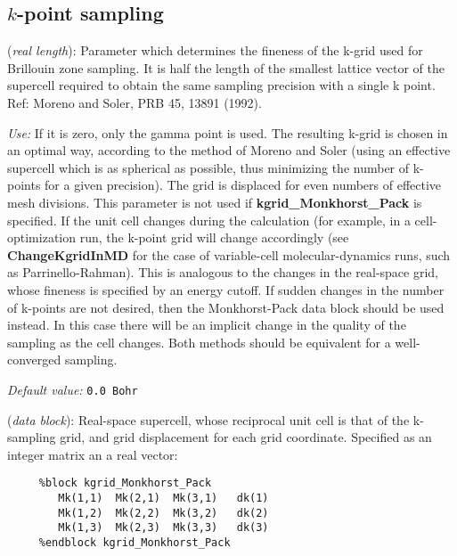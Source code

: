 \documentclass[11pt]{article}
\begin{document}
\subsection{$k$-point sampling}
\begin{description}
\itemsep 10pt
\parsep 0pt


\item[{\bf kgrid\_cutoff}] ({\it real length}): 
Parameter which determines
the fineness of the k-grid used for Brillouin zone sampling.
It is half the length of the smallest lattice vector of the supercell 
required to obtain the same sampling precision with a single k point.
Ref: Moreno and Soler, PRB 45, 13891 (1992).

{\it Use:} If it is zero, only the gamma point is used.  The resulting
k-grid is chosen in an optimal way, according to the method of Moreno
and Soler (using an effective supercell which is as spherical as
possible, thus minimizing the number of k-points for a given
precision). The grid is displaced for even numbers of effective mesh
divisions.  This parameter is not used if {\bf kgrid\_Monkhorst\_Pack}
is specified. If the unit cell changes during the calculation (for
example, in a cell-optimization run, the k-point
grid will change accordingly (see {\bf ChangeKgridInMD} for the case
of variable-cell molecular-dynamics runs, such as Parrinello-Rahman). 
This is analogous to the changes in the
real-space grid, whose fineness is specified by an energy cutoff. If
sudden changes in the number of k-points are not desired, then the
Monkhorst-Pack data block should be used instead. In this case there
will be an implicit change in the quality of the sampling as the cell
changes. Both methods should be equivalent for a well-converged
sampling.

{\it Default value:} {\tt 0.0 Bohr}
        

\item[{\bf kgrid\_Monkhorst\_Pack}] ({\it data block}): 
Real-space supercell, whose reciprocal unit cell is that of the
k-sampling grid, and grid displacement for each grid coordinate.
Specified as an integer matrix an a real vector:

\begin{verbatim}
     %block kgrid_Monkhorst_Pack
        Mk(1,1)  Mk(2,1)  Mk(3,1)   dk(1) 
        Mk(1,2)  Mk(2,2)  Mk(3,2)   dk(2) 
        Mk(1,3)  Mk(2,3)  Mk(3,3)   dk(3) 
     %endblock kgrid_Monkhorst_Pack 
\end{verbatim}


\end{description}
\end{document}
